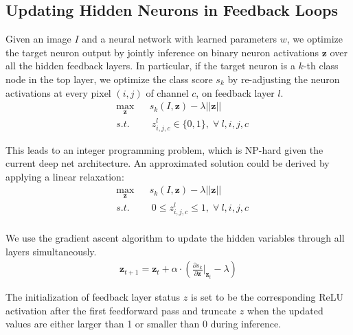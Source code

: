 \subsection{Updating Hidden Neurons in Feedback Loops}
Given an image $I$ and a neural network with learned parameters $w$, we optimize the target neuron output by jointly inference on binary neuron activations $\mathbf{z}$ over all the hidden feedback layers. In particular, if the target neuron is a $k$-th class node in the top layer, we optimize the class score $s_k$ by re-adjusting the {\color{red} neuron activations} at every {\color{red} pixel $(i,j)$ of channel $c$, on feedback layer $l$.}
\vspace{-3pt}
\begin{equation}
\begin{aligned}
& \max_\mathbf{z} & & s_k(I, \mathbf{z}) - \lambda ||\mathbf{z}|| \\
& s.t. & & \ z^l_{i,j,c} \in \{0, 1\}, \; \forall\ l, i, j, c
\end{aligned}
\end{equation}
\vspace{-5pt}

This leads to an integer programming problem, which is NP-hard given the current deep net architecture. An approximated solution could be derived by applying a linear relaxation:
\begin{equation}
\begin{aligned}
& \max_\mathbf{z} & & s_k(I, \mathbf{z}) - \lambda ||\mathbf{z}|| \\
& s.t. & & \ 0 \leq z^l_{i,j,c} \leq 1, \; \forall\ l, i, j, c\\
\end{aligned}
\end{equation}

We use the gradient ascent algorithm to update the hidden variables through all layers simultaneously.
\begin{equation}
\begin{aligned}
\mathbf{z}_{t+1} = \mathbf{z}_t + \alpha \cdot (\frac{\partial s_k}{\partial \mathbf{z}} |_{\mathbf{z}_t} - \lambda)
\end{aligned}
\end{equation}

The initialization of feedback layer status $z$ is set to be the corresponding ReLU activation after the first feedforward pass and truncate $z$ when the updated values are either larger than 1 or smaller than 0 during inference.

